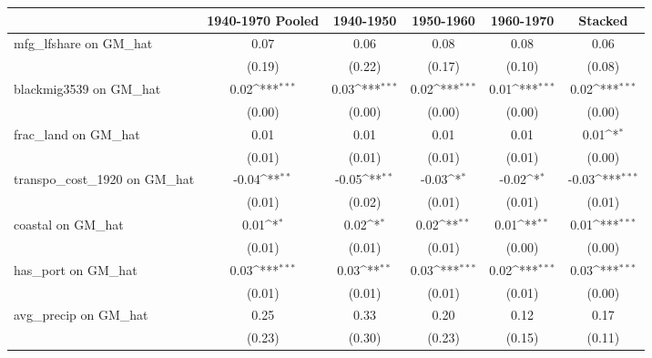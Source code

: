 {
\def\sym#1{\ifmmode^{#1}\else\(^{#1}\)\fi}
\begin{tabular}{l*{5}{c}}
\toprule
                &\multicolumn{1}{c}{1940-1970 Pooled}&\multicolumn{1}{c}{1940-1950}&\multicolumn{1}{c}{1950-1960}&\multicolumn{1}{c}{1960-1970}&\multicolumn{1}{c}{Stacked}\\
\midrule
mfg\_lfshare on GM\_hat&     0.07         &     0.06         &     0.08         &     0.08         &     0.06         \\
                &   (0.19)         &   (0.22)         &   (0.17)         &   (0.10)         &   (0.08)         \\
\addlinespace
blackmig3539 on GM\_hat&     0.02\sym{***}&     0.03\sym{***}&     0.02\sym{***}&     0.01\sym{***}&     0.02\sym{***}\\
                &   (0.00)         &   (0.00)         &   (0.00)         &   (0.00)         &   (0.00)         \\
\addlinespace
frac\_land on GM\_hat&     0.01         &     0.01         &     0.01         &     0.01         &     0.01\sym{*}  \\
                &   (0.01)         &   (0.01)         &   (0.01)         &   (0.01)         &   (0.00)         \\
\addlinespace
transpo\_cost\_1920 on GM\_hat&    -0.04\sym{**} &    -0.05\sym{**} &    -0.03\sym{*}  &    -0.02\sym{*}  &    -0.03\sym{***}\\
                &   (0.01)         &   (0.02)         &   (0.01)         &   (0.01)         &   (0.01)         \\
\addlinespace
coastal on GM\_hat&     0.01\sym{*}  &     0.02\sym{*}  &     0.02\sym{**} &     0.01\sym{**} &     0.01\sym{***}\\
                &   (0.01)         &   (0.01)         &   (0.01)         &   (0.00)         &   (0.00)         \\
\addlinespace
has\_port on GM\_hat&     0.03\sym{***}&     0.03\sym{**} &     0.03\sym{***}&     0.02\sym{***}&     0.03\sym{***}\\
                &   (0.01)         &   (0.01)         &   (0.01)         &   (0.01)         &   (0.00)         \\
\addlinespace
avg\_precip on GM\_hat&     0.25         &     0.33         &     0.20         &     0.12         &     0.17         \\
                &   (0.23)         &   (0.30)         &   (0.23)         &   (0.15)         &   (0.11)         \\

\end{tabular}}
